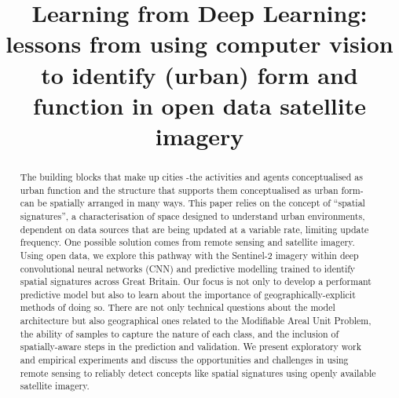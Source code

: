\documentclass[]{interact}
\theoremstyle{plain}%
\theoremstyle{definition}
\theoremstyle{remark}
\begin{document}
\title{Learning from Deep Learning: lessons from using computer vision to identify (urban) form and function in open data satellite imagery}

\maketitle %

\author{
}


\begin{abstract}
  The building blocks that make up cities -the activities and agents conceptualised as
  urban function and the structure that supports them conceptualised as urban form-
  can be spatially arranged in many ways. This paper relies on the concept of
  ``spatial signatures'', a characterisation of space designed to understand urban
  environments, dependent on data sources that are being updated at a variable rate,
  limiting update frequency. One possible solution comes from remote sensing and
  satellite imagery. Using open data, we explore this pathway with the Sentinel-2
  imagery within deep convolutional neural networks (CNN) and predictive modelling
  trained to identify spatial signatures across Great Britain. Our focus is not
  only to develop a performant predictive model but also to learn about the importance
  of geographically-explicit methods of doing so. There are not only technical
  questions about the model architecture but also geographical ones related to the Modifiable
  Areal Unit Problem, the ability of samples to capture the nature of each class, and
  the inclusion of spatially-aware steps in the prediction and validation. We present
  exploratory work and empirical experiments and discuss the opportunities and
  challenges in using remote sensing to reliably detect concepts like spatial
  signatures using openly available satellite imagery.\end{abstract}
\end{document}
